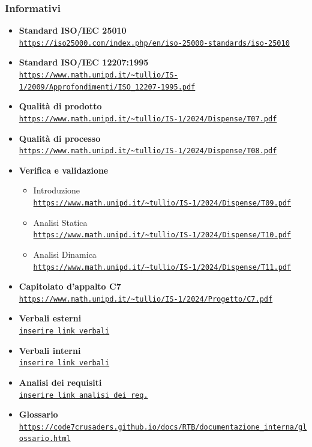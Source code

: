 \documentclass{article}
\begin{document}
\subsubsection{Informativi}
\begin{itemize}
    \item \textbf{Standard ISO/IEC 25010} \\ \texttt{\url{https://iso25000.com/index.php/en/iso-25000-standards/iso-25010}}
    \item \textbf{Standard ISO/IEC 12207:1995} \\ \texttt{\url{https://www.math.unipd.it/~tullio/IS-1/2009/Approfondimenti/ISO_12207-1995.pdf}}
    \item \textbf{Qualità di prodotto} \\ \texttt{\url{https://www.math.unipd.it/~tullio/IS-1/2024/Dispense/T07.pdf}}
    \item \textbf{Qualità di processo} \\ \texttt{\url{https://www.math.unipd.it/~tullio/IS-1/2024/Dispense/T08.pdf}}
    \item \textbf{Verifica e validazione}
    \begin{itemize}
        \item Introduzione \\ \texttt{\url{https://www.math.unipd.it/~tullio/IS-1/2024/Dispense/T09.pdf}}
        \item Analisi Statica \\ \texttt{\url{https://www.math.unipd.it/~tullio/IS-1/2024/Dispense/T10.pdf}}
        \item Analisi Dinamica \\ \texttt{\url{https://www.math.unipd.it/~tullio/IS-1/2024/Dispense/T11.pdf}}
    \end{itemize}
    \item \textbf{Capitolato d'appalto C7} \\ \texttt{\url{https://www.math.unipd.it/~tullio/IS-1/2024/Progetto/C7.pdf}}
    \item \textbf{Verbali esterni} \\ \texttt{\url{inserire link verbali}}
    \item \textbf{Verbali interni} \\ \texttt{\url{inserire link verbali}}
    \item \textbf{Analisi dei requisiti} \\ \texttt{\url{inserire link analisi dei req.}}
    \item \textbf{Glossario} \\ \texttt{\url{https://code7crusaders.github.io/docs/RTB/documentazione_interna/glossario.html}}
\end{itemize}
\end{document}
